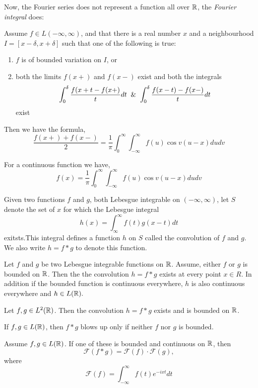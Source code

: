 \documentclass[10pt,a4paper]{book}
\begin{document}
Now, the Fourier series does not represent a function all over $\mathbb{R}$, the \textit{Fourier integral} does:
\begin{Thm}
Assume $f \in L(-\infty, \infty)$, and that there is a real number $x$ and a neighbourhood $ I = [x-\delta, x+\delta]$ such that one of the following is true:
\begin{enumerate}
    \item $f$ is of bounded variation on $I$, or
    \item both the limits $f(x+)$ and $f(x-)$ exist and both the integrals
    $$\int_0^\delta \dfrac{f(x+t- f(x+)}{t}dt \And \int_0^\delta \dfrac{f(x-t) - f(x-)}{t}dt$$
    exist
\end{enumerate}
Then we have the formula,
$$\dfrac{f(x+)+f(x-)}{2} = \dfrac{1}{\pi}\int_{0}^\infty \int_{-\infty}^\infty f(u) \cos v(u-x) du dv $$


\end{Thm}
For a continuous function we have,
$$f(x) = \dfrac{1}{\pi}\int_{0}^\infty \int_{-\infty}^\infty f(u) \cos v(u-x) du dv  $$
\begin{deff}
Given two functions $f$ and $g$, both Lebesgue integrable on
$(-\infty, \infty)$, let $S$ denote the set of $x$ for which the Lebesgue integral
$$h(x) = \int_{\infty}^\infty f(t)g(x-t) dt$$
exitsts.This integral defines a function $h$ on $S$ called the convolution of $f$ and $g$. We also write $h = f * g$ to denote this function.
\end{deff}

\begin{Thm}
Let $f$ and $g$ be two Lebesgue integrable functions on $\mathbb{R}$. Assume, either $f$ or $g$ is bounded on $\mathbb{R}$. Then the the convolution $h = f*g$ exists at every point $x \in R$. In addition if the bounded function is continuous everywhere, $h$ is also continuous everywhere and $h \in L(\mathbb{R}).$
\end{Thm}

\begin{Thm}
Let $f,g \in L^2(\mathbb{R})$. Then the convolution $h = f*g$ exists and is bounded on $\mathbb{R}$.
\end{Thm}
\PP  If $f,g \in L(\mathbb{R})$, then $f*g$ blows up only if neither $f$ nor $g$ is bounded.

\begin{Thm}
Assume $f, g \in L(\mathbb{R})$. If one of these is bounded and continuous on $\mathbb{R}$, then
$$\mathcal{F}(f*g) = \mathcal{F}(f)\cdot \mathcal{F}(g),$$
where $$\mathcal{F}(f) = \int_{-\infty}^\infty f(t)e^{-ixt} dt$$
\end{Thm}
\end{document}
